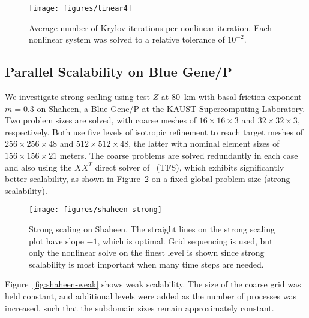 \documentclass[3p]{elsarticle}
\begin{document}
\begin{figure}
  \texttt{[image: figures/linear4]}
  \centering\caption{Average number of Krylov iterations per nonlinear iteration.  Each nonlinear system was solved to a relative tolerance of $10^{-2}$.}\label{fig:linear}
\end{figure}

\subsection{Parallel Scalability on Blue Gene/P}\label{sec:pscaling}
We investigate strong scaling using test $Z$ at \SI{80}{\kilo\metre} with basal friction exponent $m= 0.3$ on Shaheen, a Blue Gene/P at the KAUST Supercomputing Laboratory.  Two problem sizes are solved, with coarse meshes of $16\times 16\times 3$ and $32\times 32\times 3$, respectively.  Both use five levels of isotropic refinement to reach target meshes of $256\times 256\times 48$ and $512\times 512\times 48$, the latter with nominal element sizes of $156\times 156\times 21$ meters.  The coarse problems are solved redundantly in each case and also using the $XX^T$ direct solver of~\cite{tufo2001fast} (TFS), which exhibits significantly better scalability, as shown in Figure~\ref{fig:shaheen-strong} on a fixed global problem size (strong scalability).

\begin{figure}
  \texttt{[image: figures/shaheen-strong]}
  \centering\caption{Strong scaling on Shaheen.
    The straight lines on the strong scaling plot have slope $-1$, which is optimal.
    Grid sequencing is used, but only the nonlinear solve on the finest level is shown since strong scalability is most important when many time steps are needed.}\label{fig:shaheen-strong}
\end{figure}

Figure~\ref{fig:shaheen-weak} shows weak scalability.
The size of the coarse grid was held constant, and additional levels were added as the number of processes was increased, such that the subdomain sizes remain approximately constant.
\end{document}
